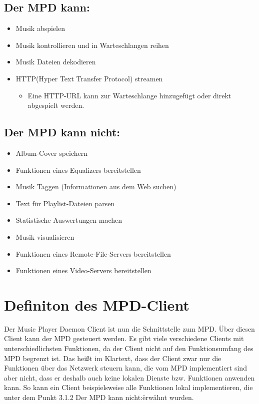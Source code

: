 \subsection{Der MPD kann:}
\renewcommand{\labelitemi}{•}
\begin{itemize}
    \item Musik abspielen
    \item Musik kontrollieren und in Warteschlangen reihen 
    \item Musik Dateien dekodieren
    \item HTTP(Hyper Text Transfer Protocol) streamen
        \renewcommand{\labelitemi}{--}
        \begin{itemize}
            \item Eine HTTP-URL kann zur Warteschlange hinzugefügt oder direkt abgespielt werden.\\
        \end{itemize}
\end{itemize}

\subsection{Der MPD kann nicht:}
\begin{itemize}
    \item Album-Cover speichern
    \item Funktionen eines Equalizers bereitstellen
    \item Musik Taggen (Informationen aus dem Web suchen)
    \item Text für Playlist-Dateien parsen
    \item Statistische Auswertungen machen
    \item Musik visualisieren
    \item Funktionen eines Remote-File-Servers bereitstellen
    \item Funktionen eines Video-Servers bereitstellen
\end{itemize}
\section{Definiton des MPD-Client}
Der Music Player Daemon Client ist nun die Schnittstelle zum MPD. Über diesen Client kann der MPD
gesteuert werden. Es gibt viele verschiedene Clients mit unterschiedlichsten Funktionen, da der 
Client nicht auf den Funktionsumfang des MPD begrenzt ist. Das heißt im Klartext, dass der Client
zwar nur die Funktionen über das Netzwerk steuern kann, die vom MPD implementiert sind aber nicht, 
dass er deshalb auch keine lokalen Dienste bzw. Funktionen anwenden kann. So kann ein Client 
beispielsweise alle Funktionen lokal implementieren, die unter dem Punkt \"3.1.2 Der MPD kann nicht:\" 
erwähnt wurden.
\newpage
